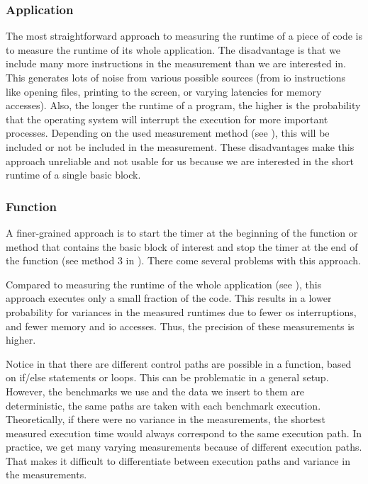 \subsubsection{Application}
\tobechecked
\label{sec:approach:datageneration:runtime:app}
The most straightforward approach to measuring the runtime of a piece of code is to measure the runtime of its whole application.
The disadvantage is that we include many more instructions in the measurement than we are interested in.
This generates lots of noise from various possible sources (\eg from \ac{io} instructions like opening files, printing to the screen, or varying latencies for memory accesses).
Also, the longer the runtime of a program, the higher is the probability that the operating system will interrupt the execution for more important processes.
Depending on the used measurement method (see ), this will be included or not be included in the measurement.
These disadvantages make this approach unreliable and not usable for us because we are interested in the short runtime of a single basic block.

\subsubsection{Function}
\tobechecked
\label{sec:approach:datageneration:runtime:function}
A finer-grained approach is to start the timer at the beginning of the function or method that contains the basic block of interest and stop the timer at the end of the function (see method 3 in ).
There come several problems with this approach.

Compared to measuring the runtime of the whole application (see ), this approach executes only a small fraction of the code.
This results in a lower probability for variances in the measured runtimes due to fewer \ac{os} interruptions, and fewer memory and \ac{io} accesses.
Thus, the precision of these measurements is higher.

Notice in  that there are different control paths are possible in a function, based on if/else statements or loops.
This can be problematic in a general setup.
However, the benchmarks we use and the data we insert to them are deterministic, \ie the same paths are taken with each benchmark execution.
Theoretically, if there were no variance in the measurements, the shortest measured execution time would always correspond to the same execution path.
In practice, we get many varying measurements because of different execution paths.
That makes it difficult to differentiate between execution paths and variance in the measurements.

